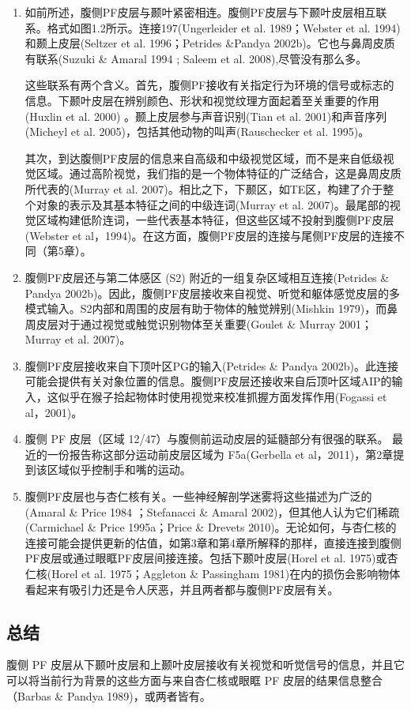 \begin{enumerate}
\item 如前所述，腹侧PF皮层与颞叶紧密相连。腹侧PF皮层与下颞叶皮层相互联系。格式如图1.2所示。连接197(Ungerleider et al. 1989；Webster et al. 1994)和颞上皮层(Seltzer et al. 1996；Petrides \&Pandya 2002b)。它也与鼻周皮质有联系(Suzuki \& Amaral 1994 ; Saleem et al. 2008),尽管没有那么多。 
\par
这些联系有两个含义。首先，腹侧PF接收有关指定行为环境的信号或标志的信息。下颞叶皮层在辨别颜色、形状和视觉纹理方面起着至关重要的作用(Huxlin et al. 2000) 。颞上皮层参与声音识别(Tian et al. 2001)和声音序列(Micheyl et al. 2005)，包括其他动物的叫声(Rauschecker et al. 1995)。 
\par
其次，到达腹侧PF皮层的信息来自高级和中级视觉区域，而不是来自低级视觉区域。通过高阶视觉，我们指的是一个物体特征的广泛结合，这是鼻周皮质所代表的(Murray et al. 2007)。相比之下，下颞区，如TE区，构建了介于整个对象的表示及其基本特征之间的中级连词(Murray et al. 2007)。最尾部的视觉区域构建低阶连词，一些代表基本特征，但这些区域不投射到腹侧PF皮层(Webster et al，1994)。在这方面，腹侧PF皮层的连接与尾侧PF皮层的连接不同（第5章）。
\item 腹侧PF皮层还与第二体感区 (S2) 附近的一组复杂区域相互连接(Petrides \& Pandya 2002b)。因此，腹侧PF皮层接收来自视觉、听觉和躯体感觉皮层的多模式输入。S2内部和周围的皮层有助于物体的触觉辨别(Mishkin 1979)，而鼻周皮层对于通过视觉或触觉识别物体至关重要(Goulet \& Murray 2001；Murray et al. 2007)。
\item 腹侧PF皮层接收来自下顶叶区PG的输入(Petrides \& Pandya 2002b)。此连接可能会提供有关对象位置的信息。腹侧PF皮层还接收来自后顶叶区域AIP的输入，这似乎在猴子拾起物体时使用视觉来校准抓握方面发挥作用(Fogassi et al，2001)。
\item 腹侧 PF 皮层（区域 12/47）与腹侧前运动皮层的延髓部分有很强的联系。 最近的一份报告称这部分运动前皮层区域为 F5a(Gerbella et al，2011)，第2章提到该区域似乎控制手和嘴的运动。 
\item 腹侧PF皮层也与杏仁核有关。一些神经解剖学迷雾将这些描述为广泛的(Amaral \& Price 1984 ；Stefanacci \& Amaral 2002)，但其他人认为它们稀疏(Carmichael \& Price 1995a；Price \& Drevets 2010)。无论如何，与杏仁核的连接可能会提供更新的估值，如第3章和第4章所解释的那样，直接连接到腹侧 PF皮层或通过眼眶PF皮层间接连接。包括下颞叶皮层(Horel et al. 1975)或杏仁核(Horel et al. 1975；Aggleton \& Passingham 1981)在内的损伤会影响物体看起来有吸引力还是令人厌恶，并且两者都与腹侧PF皮层有关。
\end{enumerate}
\subsection{总结}
腹侧 PF 皮层从下颞叶皮层和上颞叶皮层接收有关视觉和听觉信号的信息，并且它可以将当前行为背景的这些方面与来自杏仁核或眼眶 PF 皮层的结果信息整合（Barbas \& Pandya 1989)，或两者皆有。

